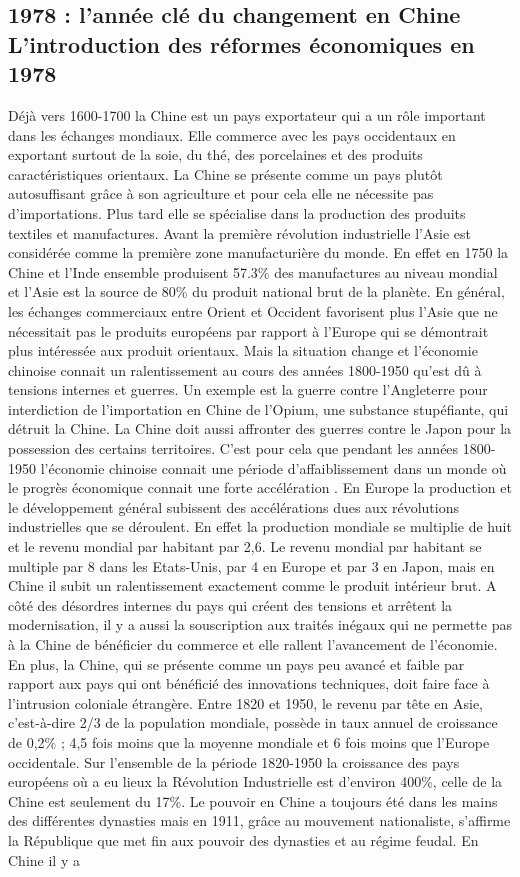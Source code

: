 \subsection{1978 : l’année clé du changement en Chine L’introduction des réformes économiques en 1978}
Déjà vers 1600-1700 la Chine est un pays exportateur qui a un rôle important dans les échanges mondiaux. Elle commerce avec les pays occidentaux en exportant surtout de la soie, du thé, des porcelaines et des produits caractéristiques orientaux.  La Chine se présente comme un pays plutôt autosuffisant grâce à son agriculture et pour cela elle ne nécessite pas d’importations. Plus tard elle se spécialise dans la production des produits textiles et manufactures. Avant la première révolution industrielle l’Asie est considérée comme la première zone manufacturière du monde. En effet en 1750 la Chine et l’Inde ensemble produisent 57.3\% des manufactures au niveau mondial et l’Asie est la source de 80\% du produit national brut de la planète.  En général, les échanges commerciaux entre Orient et Occident favorisent plus l’Asie que ne nécessitait pas le produits européens par rapport à l’Europe qui se démontrait plus intéressée aux produit orientaux.  Mais la situation change et l’économie chinoise connait un ralentissement au cours des années 1800-1950 qu’est dû à tensions internes et guerres.  Un exemple est la guerre contre l’Angleterre pour interdiction de l’importation en Chine de l’Opium, une substance stupéfiante, qui détruit la Chine. La Chine doit aussi affronter des guerres contre le Japon pour la possession des certains territoires.  C’est pour cela que pendant les années 1800-1950 l’économie chinoise connait une période d’affaiblissement dans un monde où le progrès économique connait une forte accélération . En Europe la production et le développement général subissent des accélérations dues aux révolutions industrielles que se déroulent.  En effet la production mondiale se multiplie de huit et le revenu mondial par habitant par 2,6.  Le revenu mondial par habitant se multiple par 8 dans les Etats-Unis, par 4 en Europe et par 3 en Japon, mais en Chine il subit un ralentissement exactement comme le produit intérieur brut.  A côté des désordres internes du pays qui créent des tensions et arrêtent la modernisation, il y a aussi la souscription aux traités inégaux  qui ne permette pas à la Chine de bénéficier du commerce et elle rallent l’avancement de l’économie.  En plus, la Chine, qui se présente comme un pays peu avancé et faible par rapport aux pays qui ont bénéficié des innovations techniques, doit faire face à l’intrusion coloniale étrangère.  Entre 1820 et 1950, le revenu par tête en Asie, c’est-à-dire 2/3 de la population mondiale, possède in taux annuel de croissance de 0,2\% ; 4,5 fois moins que la moyenne mondiale et 6 fois moins que l'Europe occidentale. Sur l'ensemble de la période 1820-1950 la croissance des pays européens où a eu lieux la Révolution Industrielle est d'environ 400\%, celle de la Chine est seulement du 17\%.  Le pouvoir en Chine a toujours été dans les mains des différentes dynasties mais en 1911, grâce au mouvement nationaliste, s’affirme la République que met fin aux pouvoir des dynasties et au régime feudal. En Chine il y a 